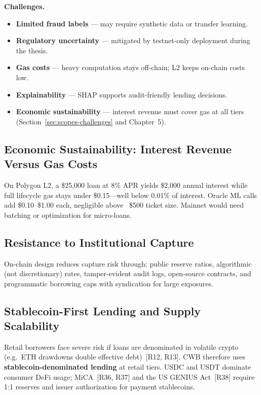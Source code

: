 \documentclass[12pt,a4paper]{report}
\begin{document}
\textbf{Challenges.}
\begin{itemize}[noitemsep]
\item \textbf{Limited fraud labels} --- may require synthetic data or transfer learning.
\item \textbf{Regulatory uncertainty} --- mitigated by testnet-only deployment during the thesis.
\item \textbf{Gas costs} --- heavy computation stays off-chain; L2 keeps on-chain costs low.
\item \textbf{Explainability} --- SHAP supports audit-friendly lending decisions.
\item \textbf{Economic sustainability} --- interest revenue must cover gas at all tiers (Section~\ref{sec:scopes-challenges} and Chapter~5).
\end{itemize}

\subsection{Economic Sustainability: Interest Revenue Versus Gas Costs}

On Polygon L2, a \$25{,}000 loan at 8\% APR yields \$2{,}000 annual interest while full lifecycle gas stays under \$0.15---well below 0.01\% of interest. Oracle ML calls add \$0.10--\$1.00 each, negligible above ~\$500 ticket size. Mainnet would need batching or optimization for micro-loans.

\subsection{Resistance to Institutional Capture}

On-chain design reduces capture risk through: public reserve ratios, algorithmic (not discretionary) rates, tamper-evident audit logs, open-source contracts, and programmatic borrowing caps with syndication for large exposures.

\subsection{Stablecoin-First Lending and Supply Scalability}
\label{sec:stablecoin-first}

Retail borrowers face severe risk if loans are denominated in volatile crypto (e.g.\ ETH drawdowns double effective debt)~[R12, R13]. CWB therefore uses \textbf{stablecoin-denominated lending} at retail tiers. USDC and USDT dominate consumer DeFi usage; MiCA~[R36, R37] and the US GENIUS Act~[R38] require 1:1 reserves and issuer authorization for payment stablecoins.
\end{document}
